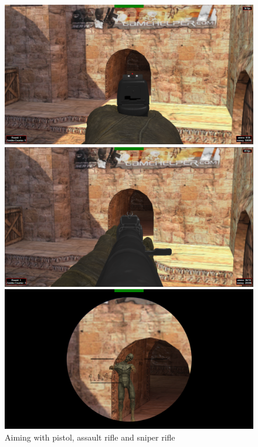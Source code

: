 \documentclass[12pt,a4paper,oneside]{article}
\theoremstyle{definition}
\begin{document}
\begin{figure}
\begin{multicols}{3}
    \includegraphics[width=\linewidth]{figures/pistol_aim.png}\par 
    \includegraphics[width=\linewidth]{figures/assault_aim.png}\par 
    \includegraphics[width=\linewidth]{figures/sniper_aim.png}\par 
    \end{multicols}
\caption{Aiming with pistol, assault rifle and sniper rifle}
\end{figure}
\end{document}
